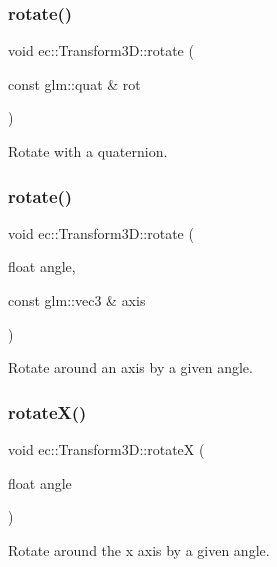 \subsubsection{\texorpdfstring{rotate()}{rotate()}\hspace{0.1cm}{\footnotesize\ttfamily [1/2]}}
{\footnotesize\ttfamily void ec\+::\+Transform3\+D\+::rotate (\begin{DoxyParamCaption}\item[{const glm\+::quat \&}]{rot }\end{DoxyParamCaption})}

Rotate with a quaternion. \mbox{\label{classec_1_1_transform3_d_ac9787bc7e772a5ef4f9a7ed36be1ae10}} 
\subsubsection{\texorpdfstring{rotate()}{rotate()}\hspace{0.1cm}{\footnotesize\ttfamily [2/2]}}
{\footnotesize\ttfamily void ec\+::\+Transform3\+D\+::rotate (\begin{DoxyParamCaption}\item[{float}]{angle,  }\item[{const glm\+::vec3 \&}]{axis }\end{DoxyParamCaption})}

Rotate around an axis by a given angle. \mbox{\label{classec_1_1_transform3_d_a620c1729b027b54d0cabe03a8cdc9253}} 
\subsubsection{\texorpdfstring{rotate\+X()}{rotateX()}}
{\footnotesize\ttfamily void ec\+::\+Transform3\+D\+::rotateX (\begin{DoxyParamCaption}\item[{float}]{angle }\end{DoxyParamCaption})}

Rotate around the x axis by a given angle. \mbox{\label{classec_1_1_transform3_d_a7124a324cea1d06b438248003d332ee2}} 
